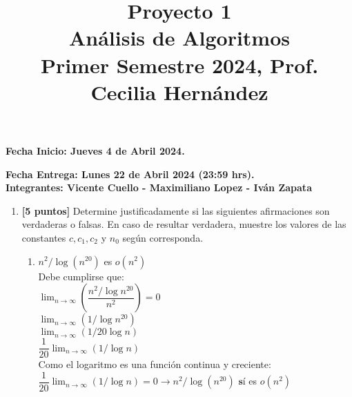 \documentclass[10pt]{article}
\title{Proyecto 1\\ {\Large Análisis de Algoritmos}\\ {\Large Primer Semestre 2024,} {\large Prof. Cecilia Hernández}}
\date{}
\begin{document}
\maketitle

 {\bf  Fecha Inicio: Jueves 4 de Abril 2024. }
 
 {\bf Fecha Entrega: Lunes 22 de Abril 2024 (23:59 hrs). }\\
 {\bf{Integrantes:} Vicente Cuello - Maximiliano Lopez - Iván Zapata}
%


\begin{enumerate}
 \item \textbf{[5 puntos]}
Determine justificadamente si las siguientes afirmaciones son verdaderas o falsas. En caso de resultar verdadera, muestre los valores de las constantes $c,c_1,c_2$ y $n_0$ según corresponda.
\begin{enumerate}
  \item $n^2/\log(n^{20})$ es $o(n^2)$\\
  Debe cumplirse que:\\$\lim_{n \to \infty}(\dfrac{n^2/\log n^{20}}{n^2})=0$\\
  $\lim_{n \to \infty}(1/\log n^{20})$\\
  $\lim_{n \to \infty}(1/20\log n)$\\
  $\dfrac{1}{20}\lim_{n \to \infty}(1/\log n)$\\
  Como el logaritmo es una función continua y creciente:\\
  $\dfrac{1}{20}\lim_{n \to \infty}(1/\log n)=0\rightarrow n^2/\log(n^{20})$ $\textbf{sí}$ es $o(n^2)$\\
  

\end{enumerate}
\end{enumerate}
\end{document}

